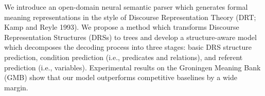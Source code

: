 We introduce an open-domain neural semantic parser which generates formal meaning representations in the style of Discourse Representation Theory (DRT; Kamp and Reyle 1993). We propose a method which transforms Discourse Representation Structures (DRSs) to trees and develop a structure-aware model which decomposes the decoding process into three stages: basic DRS structure prediction, condition prediction (i.e., predicates and relations), and referent prediction (i.e., variables). Experimental results on the Groningen Meaning Bank (GMB) show that our model outperforms competitive baselines by a wide margin.

